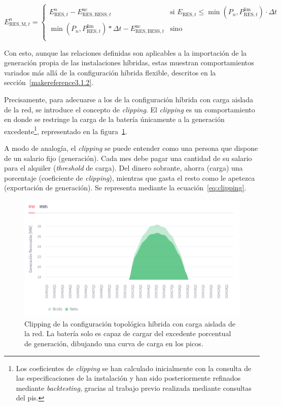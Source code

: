 \begin{equation}%
  \label{eq:res-export}
  E^{n}_{\text{RES}, \text{M}, t} =
  \begin{cases}
    E^{n}_{\text{RES}, t} - E^{\text{nc}}_{\text{RES}, \text{BESS}, t} & \text{si } E_{\text{RES}, t} \le \min(P_{n}, P^{\text{lim}}_{\text{RES}, t}) \cdot \Delta t \\
    \min(P_{n}, P^{\text{lim}}_{\text{RES}, t}) * \Delta t - E^{\text{nc}}_{\text{RES}, \text{BESS}, t} & \text{sino}                                                \\
  \end{cases}
\end{equation}

Con esto, aunque las relaciones definidas son aplicables a la importación de la generación propia de las instalaciones híbridas, estas muestran comportamientos variados más allá de la configuración híbrida flexible, descritos en la sección~\ref{makereference3.1.2}.

Precisamente, para adecuarse a los de la configuración híbrida con carga aislada de la red, se introduce el concepto de \textit{clipping}. El \textit{clipping} es un comportamiento en donde se restringe la carga de la batería únicamente a la generación excedente\footnote{Los coeficientes de \textit{clipping} se han calculado inicialmente con la consulta de las especificaciones de la instalación y han sido posteriormente refinados mediante \textit{backtesting}, gracias al trabajo previo realizada mediante consultas del \gls{pis}.}, representado en la figura~\ref{fig:clipping}.

A modo de analogía, el \textit{clipping} se puede entender como una persona que dispone de un salario fijo (generación). Cada mes debe pagar una cantidad de su salario para el alquiler (\textit{threshold} de carga). Del dinero sobrante, ahorra (carga) una porcentaje (coeficiente de \textit{clipping}), mientras que gasta el resto como le apetezca (exportación de generación). Se representa mediante la ecuación~\ref{eq:clipping}.

\begin{figure}
  \centering
  \includegraphics[width=0.75\linewidth]{figures/clipping.png}
  \caption[Clipping de configuración topológica híbrida.]{Clipping de la configuración topológica híbrida con carga aislada de la red. La batería solo es capaz de cargar del excedente porcentual de generación, dibujando una curva de carga en los picos.}%
  \label{fig:clipping}
\end{figure}

